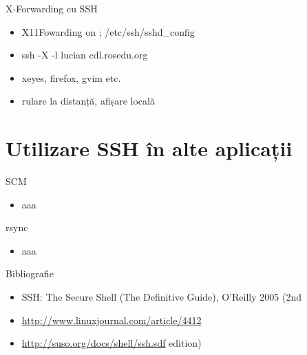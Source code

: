 \documentclass{beamer}
\begin{document}
\begin{frame}{X-Forwarding cu SSH}
  \begin{itemize}
    \item X11Fowarding on ; /etc/ssh/sshd\_config
    \item ssh -X -l lucian cdl.rosedu.org
    \item xeyes, firefox, gvim etc.
    \item rulare la distanță, afișare locală
  \end{itemize}
\end{frame}

\section{Utilizare SSH \^{i}n alte aplicații}
\frame{\tableofcontents[currentsection]}

\begin{frame}{SCM}
  \begin{itemize}
    \item aaa
  \end{itemize}
\end{frame}

\begin{frame}{rsync}
  \begin{itemize}
    \item aaa
  \end{itemize}
\end{frame}

\begin{frame}{Bibliografie}
  \begin{itemize}
    \item SSH: The Secure Shell (The Definitive Guide), O'Reilly 2005 (2nd
    \item \url{http://www.linuxjournal.com/article/4412}
    \item \url{http://suso.org/docs/shell/ssh.sdf}
edition)
  \end{itemize}
\end{frame}
\end{document}

